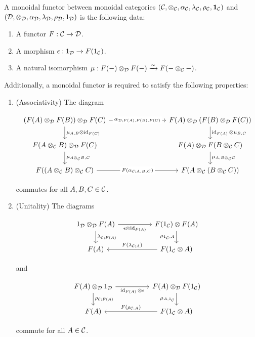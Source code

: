 \begin{defn} A monoidal functor between monoidal categories $({\mathcal C},\otimes_{{\mathcal C}}, \alpha_{{\mathcal C}},\lambda_{{\mathcal C}},\rho_{{\mathcal C}},{\mathbf 1}_{{\mathcal C}})$ and $({\mathcal D},\otimes_{{\mathcal D}},\alpha_{{\mathcal D}},\lambda_{{\mathcal D}},\rho_{{\mathcal D}},1_{{\mathcal D}})$ is the following data:

\begin{enumerate}
\item A functor $F: {\mathcal C}\to {\mathcal D}$.
\item A morphism $\epsilon:1_{{\mathcal D}}\to F(1_{{\mathcal C}})$.
\item A natural isomorphism $\mu: F(\--)\otimes_{{\mathcal D}}F(\--)\xrightarrow{\sim}F(\--\otimes_{{\mathcal C}}\--)$.
\end{enumerate}

Additionally, a monoidal functor is required to satisfy the following properties:

\begin{enumerate}
\item (Associativity) The diagram

\[\begin{tikzcd}
	{(F(A)\otimes_{\cD}F(B))\otimes_{\cD}F(C)} &&& {F(A)\otimes_{\cD}(F(B)\otimes_{\cD}F(C))} \\
	{F(A\otimes_{\cC}B)\otimes_{\cD}F(C)} &&& {F(A)\otimes_{\cD}F(B\otimes_{\cC}C)} \\
	{F((A\otimes_{\cC} B)\otimes_{\cC}C)} && {} & {F(A\otimes_{\cC}(B\otimes_{\cC}C))}
	\arrow["{\mu_{A,B}\otimes \id_{F(C)}}", from=1-1, to=2-1]
	\arrow["{\mu_{A\otimes_{\cC}B,C}}", from=2-1, to=3-1]
	\arrow["{\mu_{A,B\otimes_{\cC}C}}", from=2-4, to=3-4]
	\arrow["{\id_{F(A)}\otimes\mu_{B,C}}", from=1-4, to=2-4]
	\arrow["{F(\alpha_{\cC;A,B,C})}"{description}, from=3-1, to=3-4]
	\arrow["{\alpha_{\cD;F(A),F(B),F(C)}}"{description}, from=1-1, to=1-4]
\end{tikzcd}\]

commutes for all $A,B,C\in {\mathcal C}$.

\item (Unitality) The diagrams

\[\begin{tikzcd}
	{1_{\cD}\otimes_{\cD}F(A)} && {F(1_{\cC})\otimes F(A)} \\
	{F(A)} && {F(1_{\cC}\otimes A)}
	\arrow["{\lambda_{\cC;F(A)}}", from=1-1, to=2-1]
	\arrow["{F(\lambda_{\cC;A})}"', from=2-3, to=2-1]
	\arrow["{\mu_{1_{\cC},A}}"', from=1-3, to=2-3]
	\arrow["{\epsilon\otimes \id_{F(A)}}"', from=1-1, to=1-3]
\end{tikzcd}\]

and

\[\begin{tikzcd}
	{F(A)\otimes_{\cD}1_{\cD}} && {F(A)\otimes_{\cD}F(1_{\cC})} \\
	{F(A)} && {F(1_{\cC}\otimes A)}
	\arrow["{\rho_{\cC;F(A)}}", from=1-1, to=2-1]
	\arrow["{F(\rho_{\cC;A})}"', from=2-3, to=2-1]
	\arrow["{\mu_{A,1_{\cC}}}"', from=1-3, to=2-3]
	\arrow["{\id_{F(A)}\otimes\epsilon}"', from=1-1, to=1-3]
\end{tikzcd}\]

commute for all $A\in {\mathcal C}$.
\end{enumerate}

\raggedleft\qedsymbol{}
\end{defn}
